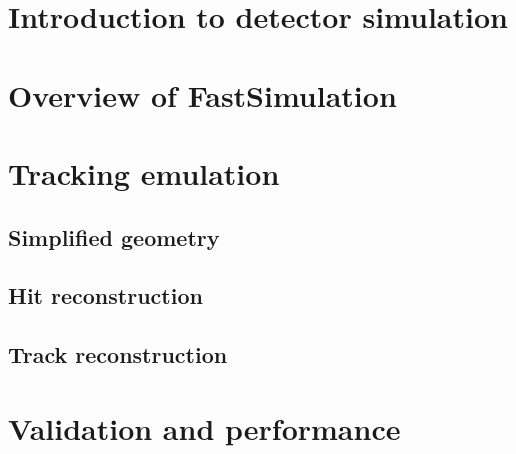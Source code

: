 
\section{Introduction to detector simulation}

\section{Overview of FastSimulation}

\section{Tracking emulation}

\subsection{Simplified geometry}

\subsection{Hit reconstruction}

\subsection{Track reconstruction}

\section{Validation and performance}
